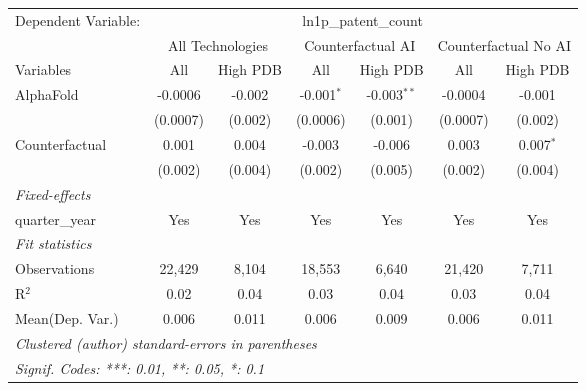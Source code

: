 \begingroup
\centering
\begin{tabular}{lcccccc}
   \tabularnewline \midrule \midrule
   Dependent Variable: & \multicolumn{6}{c}{ln1p\_patent\_count}\\
 & \multicolumn{2}{c}{All Technologies} & \multicolumn{2}{c}{Counterfactual AI} & \multicolumn{2}{c}{Counterfactual No AI} \\
\cmidrule(lr){1-1}\cmidrule(lr){2-3} \cmidrule(lr){4-5} \cmidrule(lr){6-7}
Variables & \multicolumn{1}{c}{All} & \multicolumn{1}{c}{High PDB} & \multicolumn{1}{c}{All} & \multicolumn{1}{c}{High PDB} & \multicolumn{1}{c}{All} & \multicolumn{1}{c}{High PDB} \\
\cmidrule(lr){1-1}\cmidrule(lr){2-2} \cmidrule(lr){3-3} \cmidrule(lr){4-4} \cmidrule(lr){5-5} \cmidrule(lr){6-6} \cmidrule(lr){7-7}
   AlphaFold      & -0.0006  & -0.002  & -0.001$^{*}$ & -0.003$^{**}$ & -0.0004  & -0.001\\   
                  & (0.0007) & (0.002) & (0.0006)     & (0.001)       & (0.0007) & (0.002)\\   
   Counterfactual & 0.001    & 0.004   & -0.003       & -0.006        & 0.003    & 0.007$^{*}$\\   
                  & (0.002)  & (0.004) & (0.002)      & (0.005)       & (0.002)  & (0.004)\\   
   \midrule
   \emph{Fixed-effects}\\
   quarter\_year  & Yes      & Yes     & Yes          & Yes           & Yes      & Yes\\  
   \midrule
   \emph{Fit statistics}\\
   Observations   & 22,429   & 8,104   & 18,553       & 6,640         & 21,420   & 7,711\\  
   R$^2$          & 0.02     & 0.04    & 0.03         & 0.04          & 0.03     & 0.04\\  
Mean(Dep. Var.) & 0.006 & 0.011 & 0.006 & 0.009 & 0.006 & 0.011 \\
   \midrule \midrule
   \multicolumn{7}{l}{\emph{Clustered (author) standard-errors in parentheses}}\\
   \multicolumn{7}{l}{\emph{Signif. Codes: ***: 0.01, **: 0.05, *: 0.1}}\\
\end{tabular}
\par\endgroup
